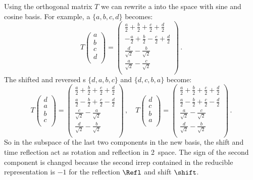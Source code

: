 \begin{description}
Using the orthogonal matrix $T$ we can rewrite a {\lattstate} into the space with sine and cosine
basis. For example, a {\lattstate} $\{a, b, c, d\}$ becomes:
\[
T
\left(
\begin{array}{c}
 a \\
 b \\
 c \\
 d \\
\end{array}
\right)
=
\left(
\begin{array}{c}
 \frac{a}{2}+\frac{b}{2}+\frac{c}{2}+\frac{d}{2} \\
 -\frac{a}{2}+\frac{b}{2}-\frac{c}{2}+\frac{d}{2} \\
 \frac{d}{\sqrt{2}}-\frac{b}{\sqrt{2}} \\
 \frac{a}{\sqrt{2}}-\frac{c}{\sqrt{2}} \\
\end{array}
\right) \,.
\]
The shifted and reversed {\lattstate}s $\{d, a, b, c\}$ and $\{d, c, b, a\}$ become:
\[
T
\left(
\begin{array}{c}
 d \\
 a \\
 b \\
 c \\
\end{array}
\right)
=
\left(
\begin{array}{c}
 \frac{a}{2}+\frac{b}{2}+\frac{c}{2}+\frac{d}{2} \\
 \frac{a}{2}-\frac{b}{2}+\frac{c}{2}-\frac{d}{2} \\
 \frac{c}{\sqrt{2}}-\frac{a}{\sqrt{2}} \\
 \frac{d}{\sqrt{2}}-\frac{b}{\sqrt{2}} \\
\end{array}
\right) \,,
\quad
T
\left(
\begin{array}{c}
 d \\
 c \\
 b \\
 a \\
\end{array}
\right)
=
\left(
\begin{array}{c}
 \frac{a}{2}+\frac{b}{2}+\frac{c}{2}+\frac{d}{2} \\
 \frac{a}{2}-\frac{b}{2}+\frac{c}{2}-\frac{d}{2} \\
 \frac{a}{\sqrt{2}}-\frac{c}{\sqrt{2}} \\
 \frac{d}{\sqrt{2}}-\frac{b}{\sqrt{2}} \\
\end{array}
\right) \,.
\]
So in the subspace of the last two components in the new basis, the shift and time reflection act
as rotation and reflection in 2\dmn\ space. The sign of the second component is changed
because the second irrep contained in the reducible representation is $-1$ for the reflection ${\Refl}$ and
shift $\shift$.


\end{description}
